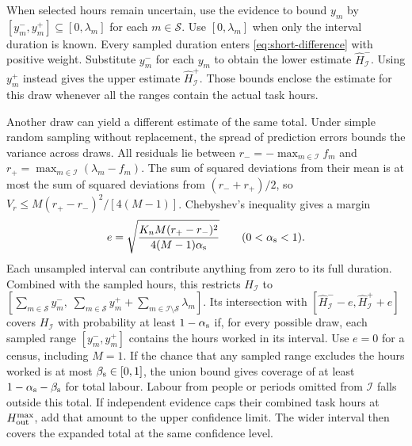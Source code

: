 When selected hours remain uncertain, use the evidence to bound $y_m$ by $[y_m^-,y_m^+]\subseteq[0,\lambda_m]$ for each $m\in\mathcal S$. Use $[0,\lambda_m]$ when only the interval duration is known. Every sampled duration enters \eqref{eq:short-difference} with positive weight. Substitute $y_m^-$ for each $y_m$ to obtain the lower estimate $\widehat H_{\mathcal I}^-$. Using $y_m^+$ instead gives the upper estimate $\widehat H_{\mathcal I}^+$. Those bounds enclose the estimate for this draw whenever all the ranges contain the actual task hours.

Another draw can yield a different estimate of the same total. Under simple random sampling without replacement, the spread of prediction errors bounds the variance across draws.
All residuals lie between $r_-=-\max_{m\in\mathcal I} f_m$ and
$r_+=\max_{m\in\mathcal I}(\lambda_m-f_m)$. The sum of squared deviations from their mean
is at most the sum of squared deviations from $(r_-+r_+)/2$, so
$V_r\le M(r_+-r_-)^2/[4(M-1)]$. Chebyshev's inequality gives a margin
\[
  e=\sqrt{\frac{K_n M(r_+-r_-)^2}{4(M-1)\alpha_{\rm s}}}\qquad (0<\alpha_{\rm s}<1).
\]
Each unsampled interval can contribute anything from zero to its full duration. Combined with the sampled hours, this restricts $H_{\mathcal I}$ to $[\sum_{m\in\mathcal S}y_m^-,\;\sum_{m\in\mathcal S}y_m^++\sum_{m\in\mathcal I\setminus\mathcal S}\lambda_m]$. Its intersection with $[\widehat H_{\mathcal I}^--e,\widehat H_{\mathcal I}^++e]$ covers $H_{\mathcal I}$ with probability at least $1-\alpha_{\rm s}$ if, for every possible draw, each sampled range $[y_m^-,y_m^+]$ contains the hours worked in its interval. Use $e=0$ for a census, including
$M=1$. If the chance that any sampled range excludes the hours worked is at most $\beta_{\rm s}\in[0,1]$, the union bound gives coverage of at least $1-\alpha_{\rm s}-\beta_{\rm s}$ for total labour. Labour from people or periods omitted from $\mathcal I$ falls outside this total. If independent evidence caps their combined task hours at $H_{\rm out}^{\max}$, add that amount to the upper confidence limit. The wider interval then covers the expanded total at the same confidence level.
